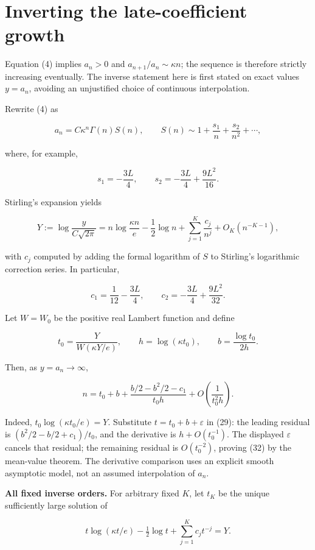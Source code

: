 \documentclass[11pt,letterpaper]{article}
\theoremstyle{remark}
\begin{document}
\section{Inverting the late-coefficient
growth}\label{inverting-the-late-coefficient-growth}

Equation (4) implies \(a_n>0\) and \(a_{n+1}/a_n\sim\kappa n\); the
sequence is therefore strictly increasing eventually. The inverse
statement here is first stated on exact values \(y=a_n\), avoiding an
unjustified choice of continuous interpolation.

Rewrite (4) as

\[
a_n=C\kappa^n\Gamma(n)S(n),\qquad
S(n)\sim1+\frac{s_1}{n}+\frac{s_2}{n^2}+\cdots,
\]

where, for example,

\[
s_1=-\frac{3L}{4},\qquad
s_2=-\frac{3L}{4}+\frac{9L^2}{16}.
\tag{28}
\]

Stirling's expansion yields

\[
Y:=\log\frac{y}{C\sqrt{2\pi}}
=n\log\frac{\kappa n}{e}-\frac12\log n
+\sum_{j=1}^{K}\frac{c_j}{n^j}+O_K(n^{-K-1}),
\tag{29}
\]

with \(c_j\) computed by adding the formal logarithm of \(S\) to
Stirling's logarithmic correction series. In particular,

\[
c_1=\frac1{12}-\frac{3L}{4},\qquad
c_2=-\frac{3L}{4}+\frac{9L^2}{32}.
\tag{30}
\]

Let \(W=W_0\) be the positive real Lambert function and define

\[
t_0=\frac{Y}{W(\kappa Y/e)},\qquad h=\log(\kappa t_0),\qquad b=\frac{\log t_0}{2h}.
\tag{31}
\]

Then, as \(y=a_n\to\infty\),

\[
\boxed{\displaystyle n=t_0+b+
\frac{b/2-b^2/2-c_1}{t_0h}
+O\!\left(\frac1{t_0^2h}\right).}
\tag{32}
\]

Indeed, \(t_0\log(\kappa t_0/e)=Y\). Substitute \(t=t_0+b+\varepsilon\)
in (29): the leading residual is \((b^2/2-b/2+c_1)/t_0\), and the
derivative is \(h+O(t_0^{-1})\). The displayed \(\varepsilon\) cancels
that residual; the remaining residual is \(O(t_0^{-2})\), proving (32)
by the mean-value theorem. The derivative comparison uses an explicit
smooth asymptotic model, not an assumed interpolation of \(a_n\).

\textbf{All fixed inverse orders.} For arbitrary fixed \(K\), let
\(t_K\) be the unique sufficiently large solution of

\[
t\log(\kappa t/e)-\tfrac12\log t+\sum_{j=1}^{K}c_jt^{-j}=Y.
\tag{33}
\]
\end{document}
